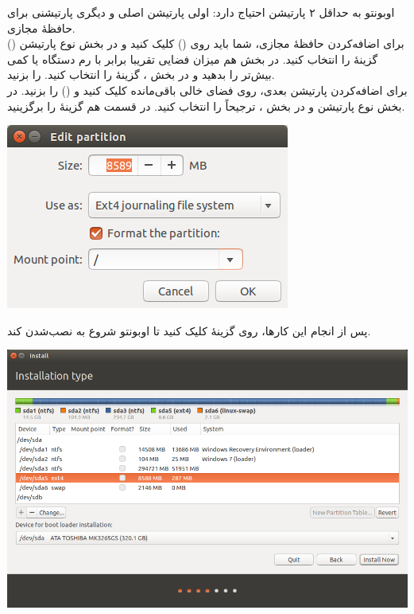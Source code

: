 اوبونتو به حداقل ۲ پارتیشن احتیاج دارد: اولی پارتیشن اصلی و دیگری پارتیشنی برای 
حافظهٔ مجازی.\\
برای اضافه‌کردن حافظهٔ مجازی، شما باید روی \lr{+} () کلیک کنید و در بخش 
نوع پارتیشن () گزینهٔ  را انتخاب 
کنید. در بخش  هم میزان فضایی تقریبا برابر با 
رم دستگاه یا کمی بیش‌تر را بدهید و در بخش ، گزینهٔ  را 
انتخاب کنید.  را بزنید.\\
برای اضافه‌کردن پارتیشن بعدی، روی فضای خالی باقی‌مانده کلیک کنید و \lr{+} 
() را بزنید. در بخش نوع پارتیشن  و در بخش ، 
ترجیحاً  را انتخاب کنید. در قسمت  هم گزینهٔ \lr{/} را 
برگزینید.\\
\begin{center}
\includegraphics[scale=0.6]{pics/7.png}\\
\end{center}
پس از انجام این کارها، روی گزینهٔ  کلیک کنید تا اوبونتو شروع به 
نصب‌شدن کند.

\begin{center}
\includegraphics[scale=0.5]{pics/8.png}\\
\end{center}

